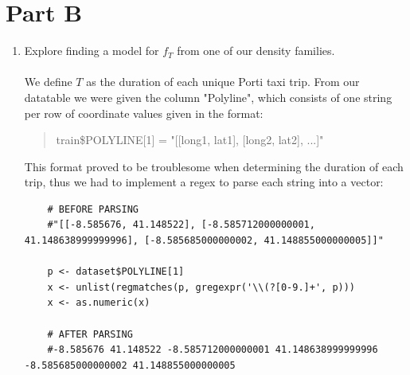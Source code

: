 \documentclass[letterpaper, 12 pt, conference]{article}
\begin{document}
\section{Part B}
\begin{enumerate}
    \item  Explore finding a model for $f_T$ from one of our density families.
    \\\\  We define $T$ as the duration of each unique Porti taxi trip. From our datatable we were given the column "Polyline", which consists of one string per row of coordinate values given in the format: 
    \begin{quote}
       train\$POLYLINE[1] = "[[long1, lat1], [long2, lat2], ...]"
    \end{quote}
    This format proved to be troublesome when determining the duration of each trip, thus we had to implement a regex to parse each string into a vector:
    \begin{lstlisting}
    # BEFORE PARSING 
    #"[[-8.585676, 41.148522], [-8.585712000000001,  41.148638999999996], [-8.585685000000002, 41.148855000000005]]"

    p <- dataset$POLYLINE[1]
    x <- unlist(regmatches(p, gregexpr('\\(?[0-9.]+', p)))
    x <- as.numeric(x)
    
    # AFTER PARSING 
    #-8.585676 41.148522 -8.585712000000001 41.148638999999996 -8.585685000000002 41.148855000000005
    \end{lstlisting}
    

\end{enumerate}
\end{document}
